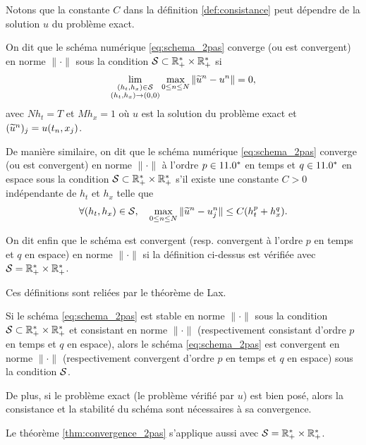 \documentclass[12pt,a4paper,twoside]{article}
\begin{document}
\begin{remark}
  Notons que la constante $C$ dans la d\'efinition \ref{def:consistance}
  peut d\'ependre de la solution $u$ du probl\`eme exact.
\end{remark}

\begin{definition}
  \label{def:convergence_2pas}
  On dit que le sch\'ema num\'erique \eqref{eq:schema_2pas} converge (ou est convergent) 
  en norme $\| \cdot \|$
  sous la condition $\mathcal{S} \subset \mathbb{R}_+^* \times \mathbb{R}_+^*$
  si 
  \begin{align}
    \lim_{\substack{(h_t,h_x) \in \mathcal{S} \\ (h_t,h_x) \to (0,0)}} \max_{0\leq n \leq N} 
    \| \widetilde{u}^n - u^n \| = 0 ,
  \end{align}
  avec $Nh_t = T$ et $Mh_x = 1$ o\`u $u$ est la solution du probl\`eme exact
  et $(\widetilde{u}^n)_j = u(t_n,x_j)$.
  
  De mani\`ere similaire, on dit que le sch\'ema num\'erique 
  \eqref{eq:schema_2pas} converge (ou est convergent) en norme $\|\cdot\|$
  \`a l'ordre $p\in11.0^*$ en temps et $q\in11.0^*$ en espace
  sous la condition $\mathcal{S} \subset \mathbb{R}_+^* \times \mathbb{R}_+^*$
  s'il existe une constante $C>0$ ind\'ependante de $h_t$ et $h_x$
  telle que
  \begin{align}
    \forall (h_t , h_x) \in \mathcal{S} , \quad \max_{0\leq n \leq N}
    \| \widetilde{u}^n - u_j^n \| \leq C (h_t^p + h_x^q) .
  \end{align}

  On dit enfin que le sch\'ema est convergent (resp. convergent \`a l'ordre $p$
  en temps et $q$ en espace) en norme $\|\cdot\|$ 
  si la d\'efinition ci-dessus est v\'erifi\'ee
  avec $\mathcal{S} = \mathbb{R}_+^* \times \mathbb{R}_+^*$.
\end{definition}

Ces d\'efinitions sont reli\'ees par le th\'eor\`eme de Lax.
\begin{theorem}
  \label{thm:convergence_2pas}
  Si le sch\'ema \eqref{eq:schema_2pas} est stable en norme $\|\cdot\|$ sous la condition
  $\mathcal{S} \subset \mathbb{R}_+^* \times \mathbb{R}_+^*$ et consistant en norme $\|\cdot\|$
  (respectivement consistant d'ordre $p$ en temps et $q$ en espace),
  alors le sch\'ema \eqref{eq:schema_2pas} est convergent en norme $\|\cdot\|$
  (respectivement convergent d'ordre $p$ en temps et $q$ en espace)
  sous la condition $\mathcal{S}$.


  De plus, si le probl\`eme exact (le probl\`eme v\'erifi\'e par $u$) 
  est bien pos\'e, alors la consistance et la stabilit\'e du sch\'ema 
  sont n\'ecessaires \`a sa convergence.
\end{theorem}
Le th\'eor\`eme \ref{thm:convergence_2pas} s'applique aussi avec $\mathcal{S} = \mathbb{R}_+^* \times \mathbb{R}_+^*$.
\end{document}
